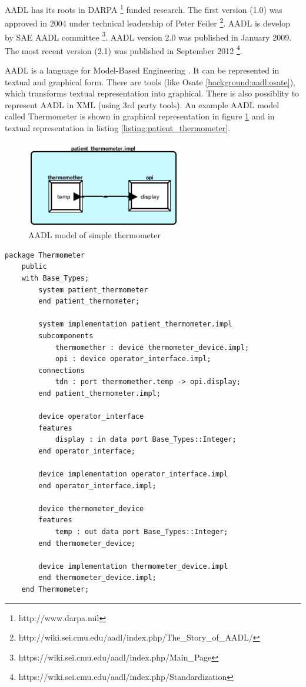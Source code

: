 AADL has its roots in DARPA \footnote{http://www.darpa.mil} funded research. The first version (1.0) was approved in 2004 under technical leadership of Peter Feiler \footnote{http://wiki.sei.cmu.edu/aadl/index.php/The\_Story\_of\_AADL/}. AADL is develop by SAE AADL committee \footnote{https://wiki.sei.cmu.edu/aadl/index.php/Main\_Page}. AADL version 2.0 was published in January 2009. The most recent version (2.1) was published in September 2012 \footnote{https://wiki.sei.cmu.edu/aadl/index.php/Standardization}.

AADL is a language for Model-Based Engineering \cite{AadlBook}. It can be represented in textual and graphical form. There are tools (like Osate \ref{background:aadl:osate}), which transforms textual representation into graphical. There is also possiblity to represent AADL in XML (using 3rd party tools). An example AADL model called Thermometer is shown in graphical representation in figure \ref{figure:patient_thermometer} and in textual representation in listing \ref{listing:patient_thermometer}.

\begin{figure}[ht]%
    \begin{center}
    	\includegraphics[height=1.5in]{figures/patient_thermometer.png}
    	\caption{AADL model of simple thermometer}
    \end{center}
    \label{figure:patient_thermometer}
\end{figure}

\begin{lstlisting}[language=aadl, frame=single, gobble=0, caption={AADL model of simple thermometer}, label={listing:patient_thermometer}]
	package Thermometer
	public
	with Base_Types;
		system patient_thermometer
		end patient_thermometer;

		system implementation patient_thermometer.impl
		subcomponents
			thermomether : device thermometer_device.impl;
			opi : device operator_interface.impl;
		connections
			tdn : port thermomether.temp -> opi.display;
		end patient_thermometer.impl;

		device operator_interface
		features
			display : in data port Base_Types::Integer;
		end operator_interface;

		device implementation operator_interface.impl
		end operator_interface.impl;

		device thermometer_device
		features
			temp : out data port Base_Types::Integer;
		end thermometer_device;

		device implementation thermometer_device.impl
		end thermometer_device.impl;
	end Thermometer;
\end{lstlisting} 

